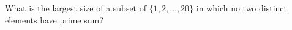 What is the largest size of a subset of $\{1,2,\ldots,20\}$ in which no two distinct elements have prime sum?
